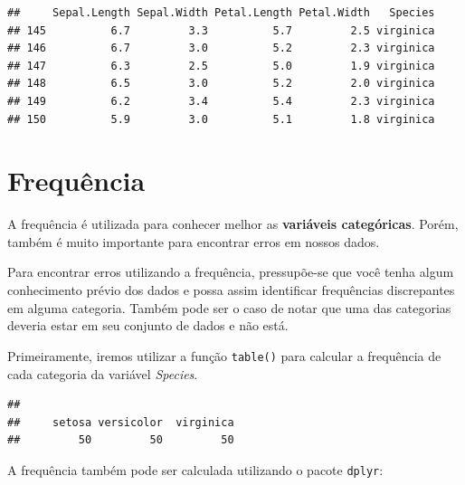 \documentclass[
]{book}
\newenvironment{Shaded}{\begin{snugshade}}{\end{snugshade}}
\newcommand{\KeywordTok}[1]{\textcolor[rgb]{0.13,0.29,0.53}{\textbf{#1}}}
\newcommand{\NormalTok}[1]{#1}
\newcommand{\OperatorTok}[1]{\textcolor[rgb]{0.81,0.36,0.00}{\textbf{#1}}}
\newcommand{\StringTok}[1]{\textcolor[rgb]{0.31,0.60,0.02}{#1}}
\begin{document}
\begin{verbatim}
##     Sepal.Length Sepal.Width Petal.Length Petal.Width   Species
## 145          6.7         3.3          5.7         2.5 virginica
## 146          6.7         3.0          5.2         2.3 virginica
## 147          6.3         2.5          5.0         1.9 virginica
## 148          6.5         3.0          5.2         2.0 virginica
## 149          6.2         3.4          5.4         2.3 virginica
## 150          5.9         3.0          5.1         1.8 virginica
\end{verbatim}

\hypertarget{frequuxeancia}{%
\section{Frequência}\label{frequuxeancia}}

A frequência é utilizada para conhecer melhor as \textbf{variáveis
categóricas}. Porém, também é muito importante para encontrar erros em
nossos dados.

Para encontrar erros utilizando a frequência, pressupõe-se que você
tenha algum conhecimento prévio dos dados e possa assim identificar
frequências discrepantes em alguma categoria. Também pode ser o caso de
notar que uma das categorias deveria estar em seu conjunto de dados e
não está.

Primeiramente, iremos utilizar a função \texttt{table()} para calcular a
frequência de cada categoria da variável \emph{Species}.

\begin{Shaded}
\end{Shaded}

\begin{verbatim}
## 
##     setosa versicolor  virginica 
##         50         50         50
\end{verbatim}

A frequência também pode ser calculada utilizando o pacote
\texttt{dplyr}:

\begin{Shaded}
\end{Shaded}
\end{document}
